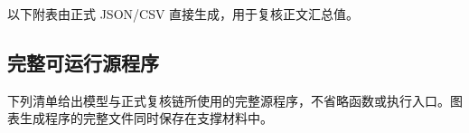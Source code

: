 以下附表由正式 JSON/CSV 直接生成，用于复核正文汇总值。



\begingroup
\let\oldsmall\small
\renewcommand{\small}{\scriptsize}
\renewcommand{\arraystretch}{0.78}

\endgroup







\subsection{完整可运行源程序}

下列清单给出模型与正式复核链所使用的完整源程序，不省略函数或执行入口。图表生成程序的完整文件同时保存在支撑材料中。
















